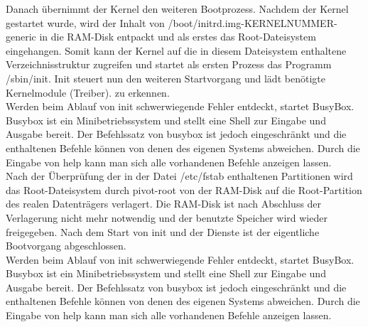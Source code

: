 \documentclass[a4paper]{article}
\begin{document}
Danach übernimmt der Kernel den weiteren Bootprozess. Nachdem der Kernel gestartet wurde, wird der Inhalt von /boot/initrd.img-KERNELNUMMER-generic in die RAM-Disk entpackt und als erstes das Root-Dateisystem eingehangen. Somit kann der Kernel auf die in diesem Dateisystem enthaltene Verzeichnisstruktur zugreifen und startet als ersten Prozess das Programm /sbin/init. Init steuert nun den weiteren Startvorgang und lädt benötigte Kernelmodule (Treiber).
zu erkennen.\\
Werden beim Ablauf von init schwerwiegende Fehler entdeckt, startet BusyBox. Busybox ist ein Minibetriebssystem und stellt eine Shell zur Eingabe und Ausgabe bereit. Der Befehlssatz von busybox ist jedoch eingeschränkt und die enthaltenen Befehle können von denen des eigenen Systems abweichen. Durch die Eingabe von help kann man sich alle vorhandenen Befehle anzeigen lassen.\\
Nach der Überprüfung der in der Datei /etc/fstab enthaltenen Partitionen wird das Root-Dateisystem durch pivot-root von der RAM-Disk auf die Root-Partition des realen Datenträgers verlagert. Die RAM-Disk ist nach Abschluss der Verlagerung nicht mehr notwendig und der benutzte Speicher wird wieder freigegeben. Nach dem Start von init und der Dienste ist der eigentliche Bootvorgang abgeschlossen.\\
Werden beim Ablauf von init schwerwiegende Fehler entdeckt, startet BusyBox. Busybox ist ein Minibetriebssystem und stellt eine Shell zur Eingabe und Ausgabe bereit. Der Befehlssatz von busybox ist jedoch eingeschränkt und die enthaltenen Befehle können von denen des eigenen Systems abweichen. Durch die Eingabe von help kann man sich alle vorhandenen Befehle anzeigen lassen.
\end{document}
